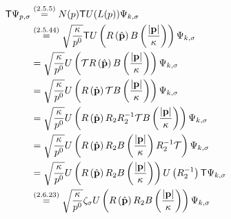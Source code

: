 \subsubsection{ }\label{sususec:2_6_p80_1}
\begin{align*} 
	\mathsf{T}\Psi_{p,\sigma}&\overset{({2.5.5})}{=}N(p)\mathsf{T} U(L(p))\Psi_{k,\sigma}\\
	&\overset{({2.5.44})}{=}\sqrt{\dfrac{\kappa}{p^0}}\mathsf{T} U\left(R\left(\hat{\mathbf{p}}\right)B\left(\dfrac{\abs{\mathbf{p}}}{\kappa}\right)\right)\Psi_{k,\sigma}\\
	&=\sqrt{\dfrac{\kappa}{p^0}}U\left(\mathcal{T} R\left(\hat{\mathbf{p}}\right)B\left(\dfrac{\abs{\mathbf{p}}}{\kappa}\right)\right)\Psi_{k,\sigma}\\
	&=\sqrt{\dfrac{\kappa}{p^0}}U\left( R\left(\hat{\mathbf{p}}\right)\mathcal{T} B\left(\dfrac{\abs{\mathbf{p}}}{\kappa}\right)\right)\Psi_{k,\sigma}\\
	&=\sqrt{\dfrac{\kappa}{p^0}}U\left( R\left(\hat{\mathbf{p}}\right)R_2 R_2^{-1}\mathcal{T} B\left(\dfrac{\abs{\mathbf{p}}}{\kappa}\right)\right)\Psi_{k,\sigma}\\
	&=\sqrt{\dfrac{\kappa}{p^0}}U\left( R\left(\hat{\mathbf{p}}\right)R_2  B\left(\dfrac{\abs{\mathbf{p}}}{\kappa}\right)R_2^{-1}\mathcal{T}\right)\Psi_{k,\sigma}\\
	&=\sqrt{\dfrac{\kappa}{p^0}}U\left( R\left(\hat{\mathbf{p}}\right)R_2  B\left(\dfrac{\abs{\mathbf{p}}}{\kappa}\right)\right)U\left(R_2^{-1}\right)\mathsf{T}\Psi_{k,\sigma}\\
	&\overset{({2.6.23})}{=}\sqrt{\dfrac{\kappa}{p^0}}\zeta_\sigma U\left( R\left(\hat{\mathbf{p}}\right)R_2  B\left(\dfrac{\abs{\mathbf{p}}}{\kappa}\right)\right)\Psi_{k,\sigma}\\
\end{align*}

